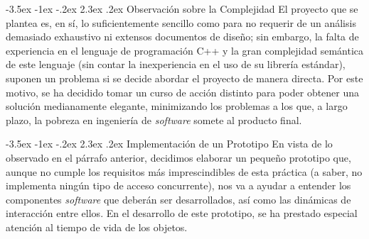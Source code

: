 \documentclass[a4paper]{article}
\makeatletter
\renewcommand\section{\@startsection {section}{1}{\z@}%
	{-3.5ex \@plus -1ex \@minus -.2ex}%
	{2.3ex \@plus.2ex}%
	{\normalfont\large\scshape}}
\makeatother
\begin{document}
	\section{Observación sobre la Complejidad}
	El proyecto que se plantea es, en sí, lo suficientemente sencillo como para no requerir de un análisis demasiado exhaustivo ni extensos documentos de diseño; sin embargo, la falta de experiencia en el lenguaje de programación C++ y la gran complejidad semántica de este lenguaje (sin contar la inexperiencia en el uso de su librería estándar), suponen un problema si se decide abordar el proyecto de manera directa. Por este motivo, se ha decidido tomar un curso de acción distinto para poder obtener una solución medianamente elegante, minimizando los problemas a los que, a largo plazo, la pobreza en ingeniería de \textit{software} somete al producto final.
	
	\section{Implementación de un Prototipo}
	En vista de lo observado en el párrafo anterior, decidimos elaborar un pequeño prototipo que, aunque no cumple los requisitos más imprescindibles de esta práctica (a saber, no implementa ningún tipo de acceso concurrente), nos va a ayudar a entender los componentes \textit{software} que deberán ser desarrollados, así como las dinámicas de interacción entre ellos. En el desarrollo de este prototipo, se ha prestado especial atención al tiempo de vida de los objetos.
	
\end{document}
